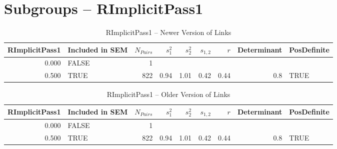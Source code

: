 \documentclass{article}\usepackage{graphicx, color}
\begin{document}
\section{Subgroups --  RImplicitPass1 }%
\begin{table}[ht]
\centering
\begin{tabular}{rlrrrrrrl}
  \hline
RImplicitPass1 & Included in SEM & $N_{Pairs}$ & $s_1^2$ & $s_2^2$ & $s_{1,2}$ & $r$ & Determinant & PosDefinite \\ 
  \hline
0.000 & FALSE & 1 &  &  &  &  &  &  \\ 
  0.500 & TRUE & 822 & 0.94 & 1.01 & 0.42 & 0.44 & 0.8 & TRUE \\ 
   \hline
\end{tabular}
\caption{RImplicitPass1 -- Newer Version of Links} 
\end{table}
\begin{table}[ht]
\centering
\begin{tabular}{rlrrrrrrl}
  \hline
RImplicitPass1 & Included in SEM & $N_{Pairs}$ & $s_1^2$ & $s_2^2$ & $s_{1,2}$ & $r$ & Determinant & PosDefinite \\ 
  \hline
0.000 & FALSE & 1 &  &  &  &  &  &  \\ 
  0.500 & TRUE & 822 & 0.94 & 1.01 & 0.42 & 0.44 & 0.8 & TRUE \\ 
   \hline
\end{tabular}
\caption{RImplicitPass1 -- Older Version of Links} 
\end{table}
\newpage 
\end{document}
